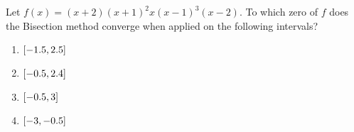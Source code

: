 \documentclass[../../../../Assignments.tex]{subfiles}
\begin{document}
\begin{exercise}
    Let \(f(x) = (x + 2) (x+1)^2 x (x - 1)^3 (x - 2)\). To which zero of \(f\)
    does the Bisection method converge when applied on the following intervals?

    \begin{multicols}{4}
        \begin{enumerate}[label = (\alph*)]
            \item \(\interval{\num{-1.5}}{\num{2.5}}\)
            \item \(\interval{\num{-0.5}}{\num{2.4}}\)
            \item \(\interval{\num{-0.5}}{3}\)
            \item \(\interval{-3}{\num{-0.5}}\)
        \end{enumerate}
    \end{multicols}
\end{exercise}
\end{document}
